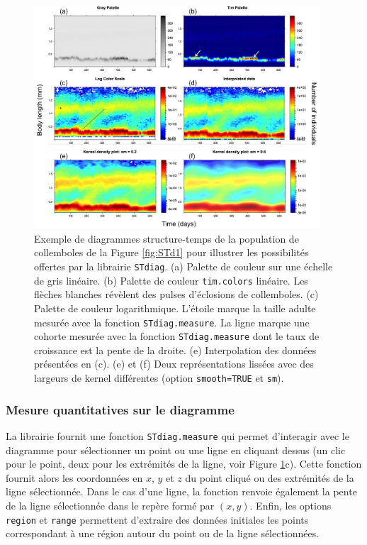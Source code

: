 \begin{figure}[!ht]
\begin{center}
\includegraphics[width=0.95\textwidth]{1_CorpsDeThese/Methodo/STdiag2}
\caption[ Diagrammes
structure-temps pour une population exemple]{Exemple de diagrammes
structure-temps de la population de collemboles de la Figure \ref{fig:STd1} pour
illustrer les possibilités offertes par la librairie \texttt{STdiag}. (a)
Palette de couleur sur une échelle de gris linéaire. (b) Palette de couleur
\texttt{tim.colors} linéaire. Les flèches blanches révèlent des pulses
d'éclosions de collemboles. (c) Palette de couleur logarithmique. L'étoile marque la taille adulte mesurée avec la fonction \texttt{STdiag.measure}. La ligne marque une cohorte mesurée avec la
fonction \texttt{STdiag.measure} dont le taux de croissance est la pente de la
droite. (e) Interpolation des données présentées en (c). (e) et (f) Deux
représentations lissées avec des largeurs de kernel différentes (option
\texttt{smooth=TRUE} et \texttt{sm}). }
\label{fig:STd2}
\end{center}
\end{figure}

\subsubsection{Mesure quantitatives sur le diagramme}

La librairie fournit une fonction \texttt{STdiag.measure} qui permet d'interagir
avec le diagramme pour sélectionner un point ou une ligne en cliquant dessus (un
clic pour le point, deux pour les extrémités de la ligne, voir Figure \ref{fig:STd2}c). Cette fonction fournit alors les coordonnées en $x$,
$y$ et $z$ du point cliqué ou des extrémités de la ligne sélectionnée. Dans le cas d'une ligne, la fonction
renvoie également la pente de la ligne sélectionnée dans le repère formé par
$(x,y)$. Enfin, les options \texttt{region} et \texttt{range} permettent
d'extraire des données initiales les points correspondant à une région autour du
point ou de la ligne sélectionnées.

